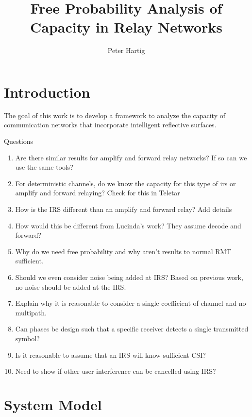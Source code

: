 \documentclass[12pt,a4paper]{report}
\title{Free Probability Analysis of Capacity in Relay Networks}
\author{Peter Hartig}
\begin{document}
\maketitle
\chapter{Introduction}
The goal of this work is to develop a framework to analyze the capacity of communication networks that incorporate intelligent reflective surfaces. 
\par
Questions
\begin{enumerate}
\item Are there similar results for amplify and forward relay networks? If so can we use the same tools?
\item For deterministic channels, do we know the capacity for this type of irs or amplify and forward relaying?
Check for this in Teletar
\item How is the IRS different than an amplify and forward relay? Add details 
\item How would this be different from Lucinda's work? 
They assume decode and forward?
\item Why do we need free probability and why aren't results to normal RMT sufficient.
\item Should we even consider noise being added at IRS? Based on previous work, no noise should be added at the IRS.
\item Explain why it is reasonable to consider a single coefficient of channel and no multipath.
\item Can phases be design such that a specific receiver detects a single transmitted symbol?
\item Is it reasonable to assume that an IRS will know sufficient CSI?
\item Need to show if other user interference can be cancelled using IRS?
\end{enumerate}
\chapter{System Model}
\end{document}
